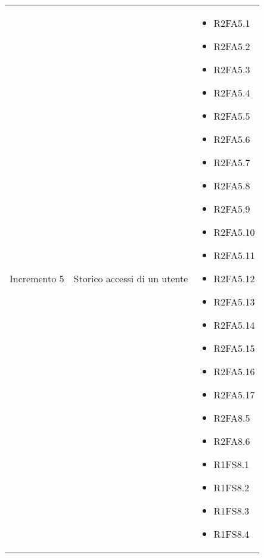 {\begin{longtable}{C{4cm} C{6cm} C{4cm}}
Incremento 5 & Storico accessi di un utente & \begin{itemize}
    \item[ ] R2FA5.1
    \item[ ] R2FA5.2
    \item[ ] R2FA5.3
    \item[ ] R2FA5.4
    \item[ ] R2FA5.5
    \item[ ] R2FA5.6
    \item[ ] R2FA5.7
    \item[ ] R2FA5.8
    \item[ ] R2FA5.9
    \item[ ] R2FA5.10
    \item[ ] R2FA5.11
    \item[ ] R2FA5.12
    \item[ ] R2FA5.13
    \item[ ] R2FA5.14
    \item[ ] R2FA5.15
    \item[ ] R2FA5.16
    \item[ ] R2FA5.17
    \item[ ] R2FA8.5
    \item[ ] R2FA8.6
    \item[ ] R1FS8.1
    \item[ ] R1FS8.2
    \item[ ] R1FS8.3
    \item[ ] R1FS8.4          
\end{itemize}\\


\end{longtable}}
